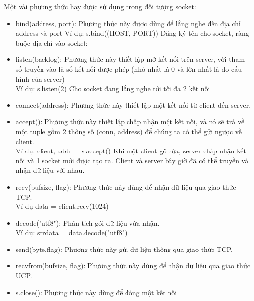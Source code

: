 \documentclass[a4paper]{article}
\begin{document}
Một vài phương thức hay được sử dụng trong đối tượng socket:\\
    \begin{itemize}
    \item bind(address, port): Phương thức này được dùng để lắng nghe đến địa chỉ address và port 
        \indent Ví dụ: s.bind((HOST, PORT)) Đăng ký tên cho socket, ràng buộc địa chỉ vào socket: 
    \item listen(backlog): Phương thức này thiết lập mở kết nối trên server, với tham số truyền vào là số kết nối được phép (nhỏ nhất là 0 và lớn nhất là do cấu hình của server)\\
    Ví dụ: s.listen(2) Cho socket đang lắng nghe tới tối đa 2 kết nối 
    \item connect(address): Phương thức này thiết lập một kết nối từ client đến server.
    \item accept(): Phương thức này thiết lập chấp nhận một kết nối, và nó sẽ trả về một tuple gồm 2 thông số (conn, address) để chúng ta có thể gửi ngược về client.\\ 
    Ví dụ: {client, addr = s.accept()} Khi một client gõ cửa, server chấp nhận kết nối và 1 socket mới được tạo ra. Client và server bây giờ đã có thể truyền và nhận dữ liệu với nhau.
    \item recv(bufsize, flag): Phương thức này dùng để nhận dữ liệu qua giao thức TCP.\\
    Ví dụ {data = client.recv(1024)}
    \item decode("utf8"): Phân tích gói dữ liệu vừa nhận.\\
    Ví dụ: strdata = data.decode("utf8")
    \item send(byte,flag): Phương thức này gửi dữ liệu thông qua giao thức TCP.
    \item recvfrom(bufsize, flag): Phương thức này dùng để nhận dữ liệu qua giao thức UCP.
    \item s.close(): Phương thức này dùng để đóng một kết nối
    \end{itemize}
\end{document}
